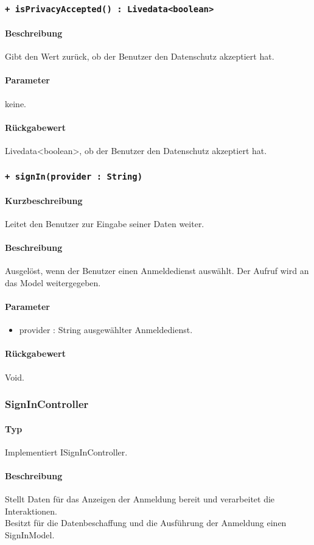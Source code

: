 \subsubsection{\texttt{+ isPrivacyAccepted() : Livedata<boolean>}}%
\paragraph*{Beschreibung}
Gibt den Wert zurück, ob der Benutzer den Datenschutz akzeptiert hat.
\paragraph*{Parameter}
keine.
\paragraph*{Rückgabewert}
Livedata<boolean>, ob der Benutzer den Datenschutz akzeptiert hat.

\subsubsection{\texttt{+ signIn(provider : String)}}%
\paragraph*{Kurzbeschreibung}
Leitet den Benutzer zur Eingabe seiner Daten weiter.
\paragraph*{Beschreibung}
Ausgelöst, wenn der Benutzer einen Anmeldedienst auswählt. 
Der Aufruf wird an das Model weitergegeben.
\paragraph*{Parameter}
\begin{itemize}
    \item provider : String ausgewählter Anmeldedienst.
\end{itemize}
\paragraph*{Rückgabewert}
Void.

\subsubsection{SignInController}
\paragraph*{Typ}
Implementiert ISignInController.
\paragraph*{Beschreibung}
Stellt Daten für das Anzeigen der Anmeldung bereit und verarbeitet die Interaktionen.\\
Besitzt für die Datenbeschaffung und die Ausführung der Anmeldung einen SignInModel.
